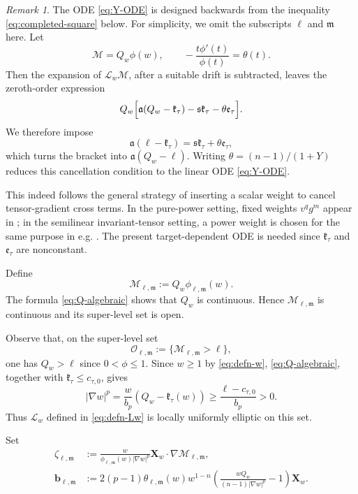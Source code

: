 \documentclass[reqno,12pt]{amsart}
\numberwithin{equation}{section}
\theoremstyle{remark}
\newtheorem{rem}[thm]{Remark}
\newcommand{\Xbf}{\mathbf X}
\newcommand{\Lscr}{\mathscr L}
\newcommand{\Mscr}{\mathscr M}
\begin{document}
\begin{rem}\label{rem:target-multiplier-design}
The ODE \eqref{eq:Y-ODE} is designed backwards from the
 inequality \eqref{eq:completed-square} below. For simplicity, we omit the subscripts $\ell$ and $\mathfrak m$ here. Let
$$\mathscr M=Q_w\phi(w), \qquad -\frac{t\phi'(t)}{\phi(t)}=\theta(t).
$$
Then the expansion of $\mathscr L_w\mathscr M$, after a suitable drift is subtracted, leaves the zeroth-order expression
$$
 Q_w\Bigl[ \mathfrak a(Q_w-\mathfrak k_\tau) -\mathfrak s\mathfrak k_\tau  -\theta\mathfrak e_\tau \Bigr].
$$
We therefore impose
$$
 \mathfrak a(\ell-\mathfrak k_\tau)
 = \mathfrak s\mathfrak k_\tau+\theta\mathfrak e_\tau,
$$
which turns the bracket into
\(\mathfrak a(Q_w-\ell)\).
Writing
\(\theta=(n-1)/(1+Y)\) reduces this cancellation condition to the
linear ODE \eqref{eq:Y-ODE}.

This indeed follows the general strategy of inserting a scalar weight to cancel tensor-gradient cross terms.  In the pure-power setting, fixed weights $v^qg^m$ appear in
\cite[Lemma~2.2,  (2.12), and Proposition~2.3,
 (2.15)]{O2025}; in the semilinear invariant-tensor
setting, a power weight is chosen for the same purpose in e.g.
\cite[Section~2.3, (2.8)]{MW2024}.
The present target-dependent ODE is needed since
$\mathfrak k_\tau$ and $\mathfrak e_\tau$ are nonconstant.
\end{rem}

Define
\begin{equation}\label{eq:defn-Mlm}
\Mscr_{\ell,\mathfrak m} :=Q_w\phi_{\ell,\mathfrak m}(w).
\end{equation}
The  formula \eqref{eq:Q-algebraic} shows that $Q_w$
is continuous.  Hence $\mathscr M_{\ell,\mathfrak m}$ is
continuous and its super-level set  is open.

Observe that, on the super-level set
$$
\mathcal O_{\ell,\mathfrak m}:=\{\Mscr_{\ell,\mathfrak m}>\ell\},
$$
one has $Q_w>\ell$ since $0<\phi\le1$. Since $w\ge1$ by \eqref{eq:defn-w}, \eqref{eq:Q-algebraic}, together with
$\mathfrak k_\tau\le c_{\tau,0}$, gives
\begin{equation}\label{eq:gradient-lower-superlevel}
|\nabla w|^p =\frac{w}{b_p}(Q_w-\mathfrak k_\tau(w))
\ge\frac{\ell-c_{\tau,0}}{b_p}>0.
\end{equation}
Thus $\Lscr_w$ defined in \eqref{eq:defn-Lw} is locally uniformly elliptic on this set.

Set
\begin{equation}\label{eq:defn-zeta} 
\begin{aligned}
 \zeta_{\ell,\mathfrak m}
 &:=\frac{w} {\phi_{\ell,\mathfrak m}(w)|\nabla w|^p}
 \Xbf_w\cdot\nabla\Mscr_{\ell,\mathfrak m},\\
 \mathbf b_{\ell,\mathfrak m}
 &:=2(p-1)\theta_{\ell,\mathfrak m}(w)w^{1-n}
 \left(\frac{wQ_w}{(n-1)|\nabla w|^p}-1  \right)\Xbf_w.
\end{aligned}
\end{equation}
\end{document}
